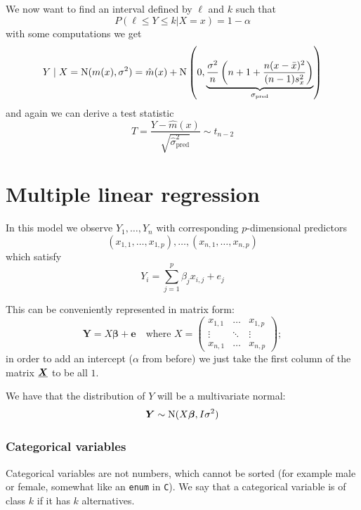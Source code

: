 \documentclass[12pt]{extarticle}
\newcommand{\Normal}{{\operatorfont N}}
\renewcommand{\vec}[1]{\bm{#1}}
\begin{document}
We now want to find an interval defined by $\ell$ and $k$ such that
\begin{equation}
    P(\ell \leq Y \leq k | X = x) = 1-\alpha
\end{equation}
with some computations we get
\begin{equation}
    Y \mid X = \Normal(m(x), \sigma^2) = \hat m(x) + \Normal\left(0, \underbrace{\frac{\sigma^2}{n}\left(n+1+ \frac{n(x-\bar x)^2}{(n-1)s^2_x}\right)}_{\sigma_\text{pred}} \right)
\end{equation}
and again we can derive a test statistic
\begin{equation}
    T = \frac{Y - \hat m(x)}{\sqrt{\hat \sigma^2_\text{pred}}} \sim t_{n-2}
\end{equation}

\section{Multiple linear regression}
In this model we observe $Y_1, \dots, Y_n$ with corresponding $p$-dimensional predictors
\begin{equation}
    (x_{1,1}, \dots, x_{1,p}), \dots, (x_{n, 1}, \dots, x_{n,p})
\end{equation}
which satisfy
\begin{equation}
    Y_i = \sum_{j = 1}^p \beta_j x_{i, j}+ e_j
\end{equation}

This can be conveniently represented in matrix form:
\begin{equation}
    \vec Y = X \vec \beta + \vec e \quad \text{where } X = \begin{pmatrix}
        x_{1, 1} & \dots  & x_{1, p} \\
        \vdots   & \ddots & \vdots   \\
        x_{n, 1} & \dots  & x_{n, p}
    \end{pmatrix};
\end{equation}
in order to add an intercept ($\alpha$ from before) we just take the first column of the matrix $\uvec X$ to be all $1$.

We have that the distribution of $Y$ will be a multivariate normal:
\begin{equation}
    \vec Y \sim \Normal(X \vec \beta, I \sigma ^2)
\end{equation}


\subsubsection{Categorical variables}
Categorical variables are not numbers, which cannot be sorted
(for example male or female, somewhat like an \texttt{enum} in \texttt{C}).
We say that a categorical variable is of class $k$ if it has $k$ alternatives.
\end{document}

